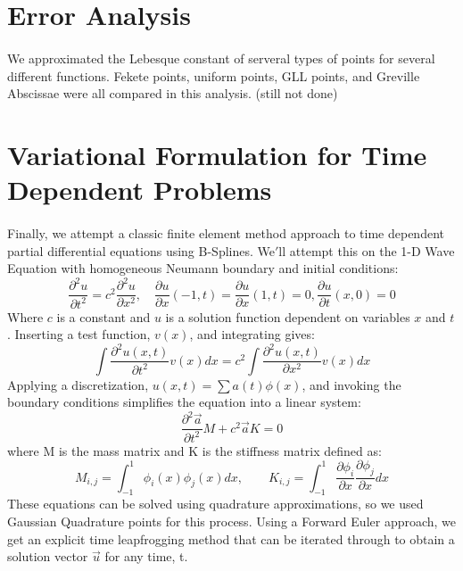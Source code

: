 \documentclass{article}
\begin{document}
\section*{Error Analysis}
\paragraph{}
We approximated the Lebesque constant of serveral types of points for several different functions. Fekete points, uniform points, GLL points, and Greville Abscissae were all compared in this analysis. (still not done)

\section*{Variational Formulation for Time Dependent Problems}
\paragraph{}
Finally, we attempt a classic finite element method approach to time dependent partial differential equations using B-Splines. We$'$ll attempt this on the 1-D Wave Equation with homogeneous Neumann boundary and initial conditions: 
\begin{equation*}
\frac{\partial ^2 u}{\partial t^2} = c^2\frac{\partial ^2 u}{\partial x^2},\quad \frac{\partial u}{\partial x}(-1,t)=\frac{\partial u}{\partial x}(1,t)=0, \frac{\partial u}{\partial t}(x,0)=0
\end{equation*}
Where $c$ is a constant and $u$ is a solution function dependent on variables $x$ and $t$. Inserting a test function, $v(x)$, and integrating gives: 
\begin{equation*}
\int \frac{\partial ^2 u(x,t)}{\partial t^2}v(x)dx = c^2\int \frac{\partial ^2 u(x,t)}{\partial x^2}v(x)dx
\end{equation*}
Applying a discretization, $u(x,t) = \sum a(t)\phi(x)$, and invoking the boundary conditions simplifies the equation into a linear system:
\begin{equation*}
\frac{\partial ^2\vec{a}}{\partial t^2}M + c^2\vec{a}K=0
\end{equation*}
where M is the mass matrix and K is the stiffness matrix defined as:
\begin{equation*}
M_{i,j}=\int ^1_{-1}\phi _i(x)\phi _j(x)dx,\qquad K_{i,j}=\int ^1_{-1}\frac{\partial \phi _i}{\partial x}\frac{\partial \phi _j}{\partial x}dx
\end{equation*}
These equations can be solved using quadrature approximations, so we used Gaussian Quadrature points for this process. Using a Forward Euler approach, we get an explicit time leapfrogging method that can be iterated through to obtain a solution vector $\vec{u}$ for any time, t.
\end{document}
